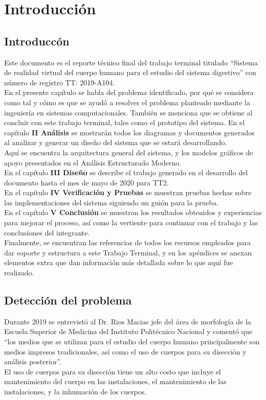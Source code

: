 \chapter{Introducción}

\section{Introduccón}
Este documento es el reporte técnico final del trabajo terminal titulado “Sistema de realidad virtual del cuerpo humano para el estudio del sistema digestivo”
 con número de registro TT: 2019-A104.\\
En el presente capítulo se habla del problema identificado, por qué se considera como tal y cómo es que se ayudó a resolver el problema planteado mediante la 
ingeniería en sistemas computacionales. También se menciona que se obtiene al concluir con este trabajo terminal, tales como el prototipo del sistema.
En el capítulo \textbf{II Análisis} se mostrarán todos los diagramas y documentos generados al analizar y generar un diseño del sistema que se estará desarrollando.\\
 Aquí se encuentra la arquitectura general del sistema, y los modelos gráficos de apoyo presentados en el Análisis Estructurado Moderno.\\
En el capítulo \textbf{III Diseño} se describe el trabajo generado en el desarrollo del documento hasta el mes de mayo de 2020 para TT2.\\
En el capítulo \textbf{IV Verificación y Pruebas} se muestran pruebas hechas sobre las implementaciones del sistema siguiendo un guión para la prueba.\\
En el capítulo \textbf{V Conclusión} se muestran los resultados obtenidos y experiencias para mejorar el proceso, así como la vertiente para continuar con el trabajo
 y las conclusiones del integrante.\\
Finalmente, se encuentran las referencias de todos los recursos empleados para dar soporte y estructura a este Trabajo Terminal, y en los apéndices se anexan elementos
 extra que dan información más detallada sobre lo que aquí fue realizado.\\

\section{Detección del problema} 
Durante 2019 se entrevistó al Dr. Rios Macias jefe del área de morfología de la Escuela Superior de Medicina del Instituto Politécnico Nacional y comentó que “los medios
 que se utilizan para el estudio del cuerpo humano principalmente son medios impresos tradicionales, así como el uso de cuerpos para su disección y análisis posterior”.\\
 El uso de cuerpos para su disección tiene un alto costo que incluye el mantenimiento del cuerpo en las instalaciones, el mantenimiento de las instalaciones, y la inhumación 
 de los cuerpos.
\\
\newline

